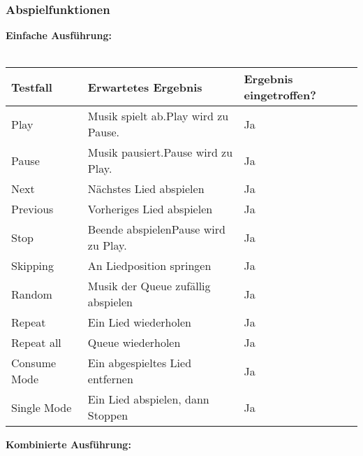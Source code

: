 \subsubsection{Abspielfunktionen}
\textbf{Einfache Ausführung:}\ \\ \\
\begin{tabularx}{\textwidth}{|X|X|l|}
    \hline
    \textbf{Testfall} & \textbf{Erwartetes Ergebnis} & \textbf{Ergebnis eingetroffen?}\\
    \hline
    Play & Musik spielt ab.\newline Play wird zu Pause. & Ja\\
    \hline
    Pause & Musik pausiert.\newline Pause wird zu Play. & Ja\\
    \hline
    Next & Nächstes Lied abspielen & Ja\\
    \hline
    Previous & Vorheriges Lied abspielen & Ja\\
    \hline
    Stop & Beende abspielen\newline Pause wird zu Play. & Ja\\
    \hline
    Skipping & An Liedposition springen & Ja\\
    \hline
    Random & Musik der Queue zufällig abspielen & Ja\\
    \hline 
    Repeat & Ein Lied wiederholen & Ja\\
    \hline
    Repeat all & Queue wiederholen & Ja\\
    \hline
    Consume Mode & Ein abgespieltes Lied entfernen & Ja\\
    \hline
    Single Mode & Ein Lied abspielen, dann Stoppen & Ja\\
    \hline
\end{tabularx}
\newpage
\textbf{Kombinierte Ausführung:}\ \\ \\

